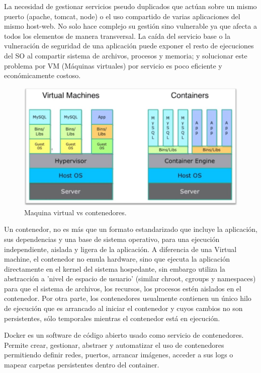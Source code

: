 La necesidad de gestionar servicios pseudo duplicados que actúan sobre un mismo puerto (apache, tomcat, node) o el uso compartido de varias aplicaciones del mismo host-web. No solo hace complejo su gestión sino vulnerable ya que afecta a todos los elementos de manera transversal. La caída del servicio base o la vulneración de seguridad de una aplicación puede exponer el resto de ejecuciones del SO al compartir sistema de archivos, procesos y memoria; y solucionar este problema por VM (Máquinas virtuales) por servicio es poco eficiente y económicamente costoso.

\begin{figure}[!htb]
\begin{center}
\includegraphics[width=1\textwidth]{./figuras/virtual_machine_vs_docker.jpg}
\caption{Maquina virtual vs contenedores\cite{i_containers}.}
\label{F:virtual_machine_vs_docker}
\end{center}
\end{figure}
Un contenedor, no es más que un formato estandarizado que incluye la aplicación, sus dependencias y una base de sistema operativo, para una ejecución independiente, aislada y ligera de la aplicación. A diferencia de una Virtual machine, el contenedor no emula hardware, sino que ejecuta la aplicación directamente en el kernel del sistema hospedante, sin embargo utiliza la abstracción a 'nivel de espacio de usuario' (similar chroot, cgroups y namespaces\cite{c_funcionamiento_docker}) para que el sistema de archivos, los recursos, los procesos estén aislados en el contenedor. Por otra parte, los contenedores usualmente contienen un único hilo de ejecución que es arrancado al iniciar el contenedor y cuyos cambios no son persistentes, sólo temporales mientras el contenedor está en ejecución.

Docker\cite{c_docker} es un software de código abierto usado como servicio de contenedores. Permite crear, gestionar, abstraer y automatizar el uso de contenedores permitiendo definir redes, puertos, arrancar imágenes, acceder a sus logs o mapear carpetas persistentes dentro del container.

